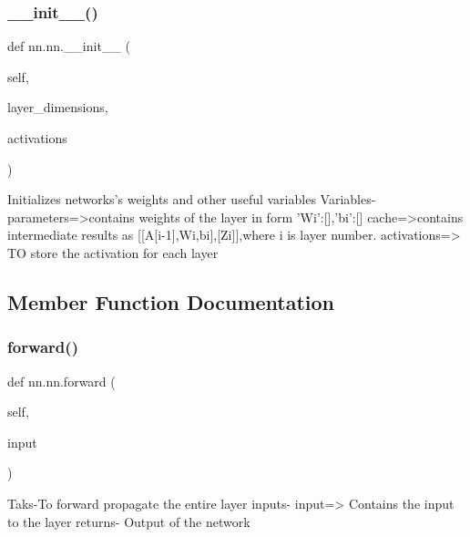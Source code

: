 \subsubsection{\texorpdfstring{\+\_\+\+\_\+init\+\_\+\+\_\+()}{\_\_init\_\_()}}
{\footnotesize\ttfamily def nn.\+nn.\+\_\+\+\_\+init\+\_\+\+\_\+ (\begin{DoxyParamCaption}\item[{}]{self,  }\item[{}]{layer\+\_\+dimensions,  }\item[{}]{activations }\end{DoxyParamCaption})}

\begin{DoxyVerb}Initializes networks's weights and other useful variables
Variables-parameters=>contains weights of the layer in form {'Wi':[],'bi':[]}
  cache=>contains intermediate results as [[A[i-1],Wi,bi],[Zi]],where i
  is layer number.
  activations=> TO store the activation for each layer
\end{DoxyVerb}
 

\subsection{Member Function Documentation}
\mbox{\label{classnn_1_1nn_ace3e99e16bb7d1256d4d1fbf7e6cebd0}} 
\subsubsection{\texorpdfstring{forward()}{forward()}}
{\footnotesize\ttfamily def nn.\+nn.\+forward (\begin{DoxyParamCaption}\item[{}]{self,  }\item[{}]{input }\end{DoxyParamCaption})}

\begin{DoxyVerb}Taks-To forward propagate the entire layer
inputs- input=> Contains the input to the layer
returns- Output of the network
\end{DoxyVerb}
 \mbox{\label{classnn_1_1nn_a1f6dba2cb835e0d723f39106534062a7}} 
